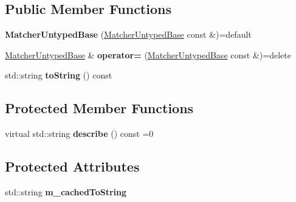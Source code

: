 \subsection*{Public Member Functions}
\begin{DoxyCompactItemize}
\item 
\mbox{\label{classCatch_1_1Matchers_1_1Impl_1_1MatcherUntypedBase_a985fd3c3ffcc9f2e8dc7a330130040b0}} 
{\bfseries Matcher\+Untyped\+Base} (\mbox{\hyperlink{classCatch_1_1Matchers_1_1Impl_1_1MatcherUntypedBase}{Matcher\+Untyped\+Base}} const \&)=default
\item 
\mbox{\label{classCatch_1_1Matchers_1_1Impl_1_1MatcherUntypedBase_a62668ccc47b64a9094dcb6413f9af80b}} 
\mbox{\hyperlink{classCatch_1_1Matchers_1_1Impl_1_1MatcherUntypedBase}{Matcher\+Untyped\+Base}} \& {\bfseries operator=} (\mbox{\hyperlink{classCatch_1_1Matchers_1_1Impl_1_1MatcherUntypedBase}{Matcher\+Untyped\+Base}} const \&)=delete
\item 
\mbox{\label{classCatch_1_1Matchers_1_1Impl_1_1MatcherUntypedBase_a5982c7c80ca71dfe2298babadad7a453}} 
std\+::string {\bfseries to\+String} () const
\end{DoxyCompactItemize}
\subsection*{Protected Member Functions}
\begin{DoxyCompactItemize}
\item 
\mbox{\label{classCatch_1_1Matchers_1_1Impl_1_1MatcherUntypedBase_a91d3a907dbfcbb596077df24f6e11fe2}} 
virtual std\+::string {\bfseries describe} () const =0
\end{DoxyCompactItemize}
\subsection*{Protected Attributes}
\begin{DoxyCompactItemize}
\item 
\mbox{\label{classCatch_1_1Matchers_1_1Impl_1_1MatcherUntypedBase_a951095c462657e7097a9a6dc4dde813f}} 
std\+::string {\bfseries m\+\_\+cached\+To\+String}
\end{DoxyCompactItemize}


